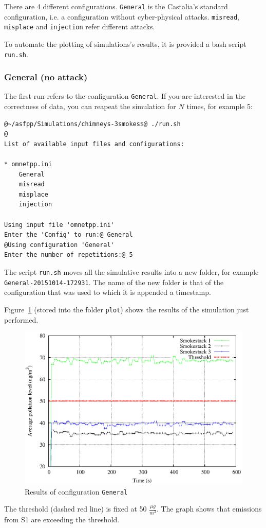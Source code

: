 There are 4 different configurations. \texttt{General} is the Castalia's standard configuration, i.e. a configuration without cyber-physical attacks. \texttt{misread}, \texttt{misplace} and \texttt{injection} refer different attacks.

To automate the plotting of simulations's results, it is provided a bash script \texttt{run.sh}.


\subsubsection{General (no attack)}
\label{subsec:no-attack}
The first run refers to the configuration \texttt{General}.  If you are interested in the correctness of data, you can reapeat the simulation for $N$ times, for example 5:
%
\begin{lstlisting}[language={terminal}]
@~/asfpp/Simulations/chimneys-3smokes$@ ./run.sh
@
List of available input files and configurations:

* omnetpp.ini
	General
	misread
	misplace
	injection

Using input file 'omnetpp.ini'
Enter the 'Config' to run:@ General
@Using configuration 'General'
Enter the number of repetitions:@ 5
\end{lstlisting}

The script \texttt{run.sh} moves all the simulative results into a new folder, for example \texttt{General-20151014-172931}. The name of the new folder is that of the configuration that was used to which it is appended a timestamp.

Figure~\ref{fig:no-attack} (stored into the folder \texttt{plot}) shows the results of the simulation just performed.
%
\begin{figure}
\centering
\includegraphics[width=.8\textwidth]{images/raster/general}
\caption{Results of configuration \texttt{General}}
\label{fig:no-attack}
\end{figure} 
%
The threshold (dashed red line) is fixed at 50 $\frac{\mu g}{m^3}$. The graph shows that emissions from S1 are exceeding the threshold.



